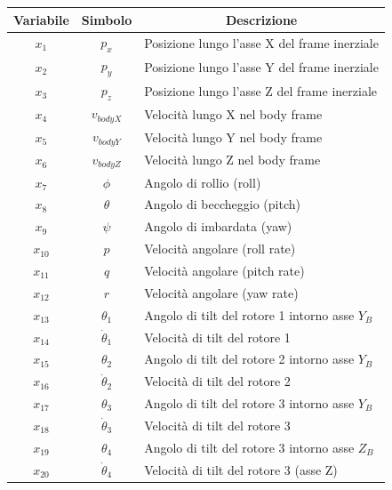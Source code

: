 \begin{table}[H]
    \centering
    \renewcommand{\arraystretch}{1.3} %
    \begin{tabular}{|c|c|l|}
        \hline
        \textbf{Variabile} & \textbf{Simbolo} & \multicolumn{1}{c|}{\textbf{Descrizione}} \\ \hline
        $x_{1}$ & $p_{x}$ & Posizione lungo l'asse X del frame inerziale \\
        $x_{2}$ & $p_{y}$ & Posizione lungo l'asse Y del frame inerziale \\
        $x_{3}$ & $p_{z}$ & Posizione lungo l'asse Z del frame inerziale \\
        $x_{4}$ & $v_{bodyX}$ & Velocità lungo X nel body frame \\
        $x_{5}$ & $v_{bodyY}$ & Velocità lungo Y nel body frame \\
        $x_{6}$ & $v_{bodyZ}$ & Velocità lungo Z nel body frame \\
        $x_{7}$ & $\phi$ & Angolo di rollio (roll) \\
        $x_{8}$ & $\theta$ & Angolo di beccheggio (pitch) \\
        $x_{9}$ & $\psi$ & Angolo di imbardata (yaw) \\
        $x_{10}$ & $p$ & Velocità angolare (roll rate) \\
        $x_{11}$ & $q$ & Velocità angolare (pitch rate) \\
        $x_{12}$ & $r$ & Velocità angolare (yaw rate) \\
        $x_{13}$ & $\theta_{1}$ & Angolo di tilt del rotore 1 intorno asse $Y_{B}$ \\
        $x_{14}$ & $\dot{\theta}_{1}$ & Velocità di tilt del rotore 1 \\
        $x_{15}$ & $\theta_{2}$ & Angolo di tilt del rotore 2 intorno asse $Y_{B}$ \\
        $x_{16}$ & $\dot{\theta}_{2}$ & Velocità di tilt del rotore 2 \\
        $x_{17}$ & $\theta_{3}$ & Angolo di tilt del rotore 3 intorno asse $Y_{B}$ \\
        $x_{18}$ & $\dot{\theta}_{3}$ & Velocità di tilt del rotore 3 \\
        $x_{19}$ & $\theta_{4}$ & Angolo di tilt del rotore 3 intorno asse $Z_{B}$ \\
        $x_{20}$ & $\dot{\theta}_{4}$ & Velocità di tilt del rotore 3 (asse Z) \\

\end{tabular}
\end{table}
